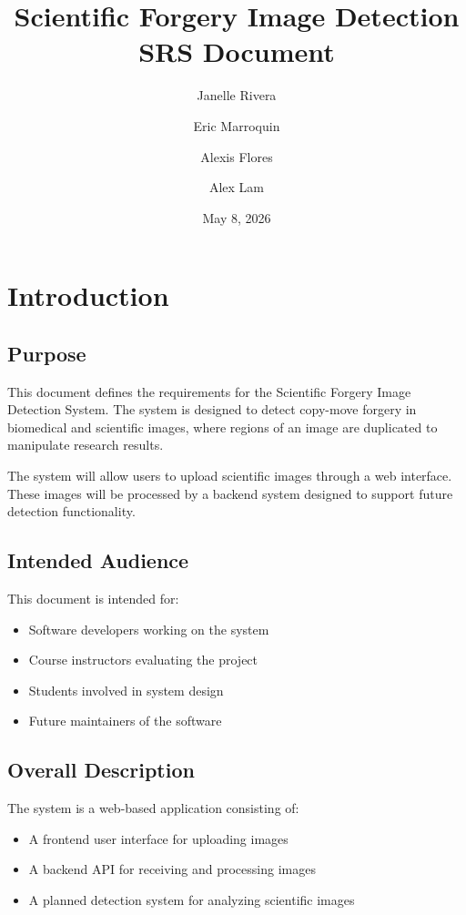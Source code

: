 \documentclass[12pt]{article}
\title{Scientific Forgery Image Detection\\SRS Document}
\author{Janelle Rivera \and Eric Marroquin \and Alexis Flores \and Alex Lam}
\date{May 8, 2026}
\begin{document}
\maketitle

\tableofcontents
\newpage

\section{Introduction}

\subsection{Purpose}

This document defines the requirements for the Scientific Forgery Image Detection
System. The system is designed to detect copy-move forgery in biomedical and
scientific images, where regions of an image are duplicated to manipulate research
results.

The system will allow users to upload scientific images through a web interface. These
images will be processed by a backend system designed to support future detection
functionality.

\subsection{Intended Audience}

This document is intended for:

\begin{itemize}
    \item Software developers working on the system
    \item Course instructors evaluating the project
    \item Students involved in system design
    \item Future maintainers of the software
\end{itemize}

\subsection{Overall Description}

The system is a web-based application consisting of:

\begin{itemize}
    \item A frontend user interface for uploading images
    \item A backend API for receiving and processing images
    \item A planned detection system for analyzing scientific images
\end{itemize}
\end{document}
